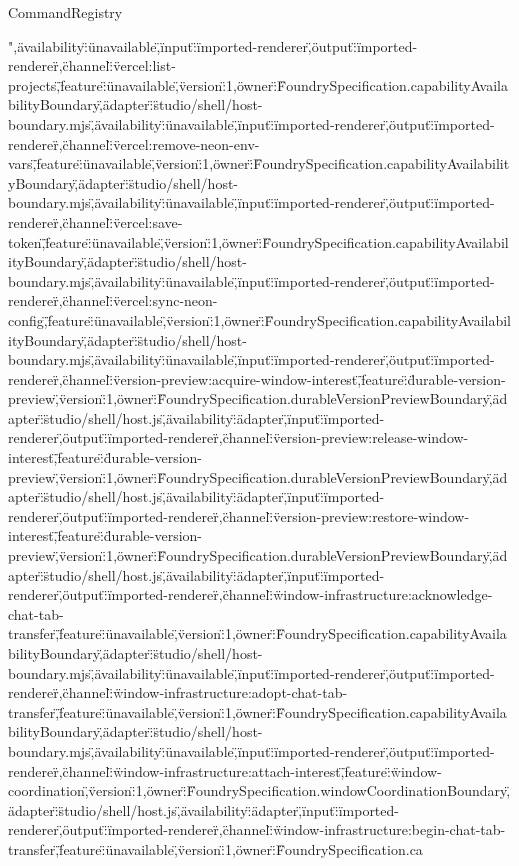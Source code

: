 \begin{lexlean}{CommandRegistry}
\begin{semanticmodule}
{",\"availability\":\"unavailable\",\"input\":\"imported-renderer\",\"output\":\"imported-renderer\"},{\"channel\":\"vercel:list-projects\",\"feature\":\"unavailable\",\"version\":1,\"owner\":\"FoundrySpecification.capabilityAvailabilityBoundary\",\"adapter\":\"studio/shell/host-boundary.mjs\",\"availability\":\"unavailable\",\"input\":\"imported-renderer\",\"output\":\"imported-renderer\"},{\"channel\":\"vercel:remove-neon-env-vars\",\"feature\":\"unavailable\",\"version\":1,\"owner\":\"FoundrySpecification.capabilityAvailabilityBoundary\",\"adapter\":\"studio/shell/host-boundary.mjs\",\"availability\":\"unavailable\",\"input\":\"imported-renderer\",\"output\":\"imported-renderer\"},{\"channel\":\"vercel:save-token\",\"feature\":\"unavailable\",\"version\":1,\"owner\":\"FoundrySpecification.capabilityAvailabilityBoundary\",\"adapter\":\"studio/shell/host-boundary.mjs\",\"availability\":\"unavailable\",\"input\":\"imported-renderer\",\"output\":\"imported-renderer\"},{\"channel\":\"vercel:sync-neon-config\",\"feature\":\"unavailable\",\"version\":1,\"owner\":\"FoundrySpecification.capabilityAvailabilityBoundary\",\"adapter\":\"studio/shell/host-boundary.mjs\",\"availability\":\"unavailable\",\"input\":\"imported-renderer\",\"output\":\"imported-renderer\"},{\"channel\":\"version-preview:acquire-window-interest\",\"feature\":\"durable-version-preview\",\"version\":1,\"owner\":\"FoundrySpecification.durableVersionPreviewBoundary\",\"adapter\":\"studio/shell/host.js\",\"availability\":\"adapter\",\"input\":\"imported-renderer\",\"output\":\"imported-renderer\"},{\"channel\":\"version-preview:release-window-interest\",\"feature\":\"durable-version-preview\",\"version\":1,\"owner\":\"FoundrySpecification.durableVersionPreviewBoundary\",\"adapter\":\"studio/shell/host.js\",\"availability\":\"adapter\",\"input\":\"imported-renderer\",\"output\":\"imported-renderer\"},{\"channel\":\"version-preview:restore-window-interest\",\"feature\":\"durable-version-preview\",\"version\":1,\"owner\":\"FoundrySpecification.durableVersionPreviewBoundary\",\"adapter\":\"studio/shell/host.js\",\"availability\":\"adapter\",\"input\":\"imported-renderer\",\"output\":\"imported-renderer\"},{\"channel\":\"window-infrastructure:acknowledge-chat-tab-transfer\",\"feature\":\"unavailable\",\"version\":1,\"owner\":\"FoundrySpecification.capabilityAvailabilityBoundary\",\"adapter\":\"studio/shell/host-boundary.mjs\",\"availability\":\"unavailable\",\"input\":\"imported-renderer\",\"output\":\"imported-renderer\"},{\"channel\":\"window-infrastructure:adopt-chat-tab-transfer\",\"feature\":\"unavailable\",\"version\":1,\"owner\":\"FoundrySpecification.capabilityAvailabilityBoundary\",\"adapter\":\"studio/shell/host-boundary.mjs\",\"availability\":\"unavailable\",\"input\":\"imported-renderer\",\"output\":\"imported-renderer\"},{\"channel\":\"window-infrastructure:attach-interest\",\"feature\":\"window-coordination\",\"version\":1,\"owner\":\"FoundrySpecification.windowCoordinationBoundary\",\"adapter\":\"studio/shell/host.js\",\"availability\":\"adapter\",\"input\":\"imported-renderer\",\"output\":\"imported-renderer\"},{\"channel\":\"window-infrastructure:begin-chat-tab-transfer\",\"feature\":\"unavailable\",\"version\":1,\"owner\":\"FoundrySpecification.ca}
\end{semanticmodule}
\end{lexlean}
